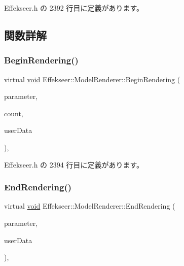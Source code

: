  Effekseer.\+h の 2392 行目に定義があります。



\subsection{関数詳解}
\mbox{\label{class_effekseer_1_1_model_renderer_a9fcfb17ad8e41bacadc862cfef302490}} 
\subsubsection{\texorpdfstring{Begin\+Rendering()}{BeginRendering()}}
{\footnotesize\ttfamily virtual \mbox{\hyperlink{namespace_effekseer_ab34c4088e512200cf4c2716f168deb56}{void}} Effekseer\+::\+Model\+Renderer\+::\+Begin\+Rendering (\begin{DoxyParamCaption}\item[{const \mbox{\hyperlink{struct_effekseer_1_1_model_renderer_1_1_node_parameter}{Node\+Parameter}} \&}]{parameter,  }\item[{int32\+\_\+t}]{count,  }\item[{\mbox{\hyperlink{namespace_effekseer_ab34c4088e512200cf4c2716f168deb56}{void}} $\ast$}]{user\+Data }\end{DoxyParamCaption})\hspace{0.3cm}{\ttfamily [inline]}, {\ttfamily [virtual]}}



 Effekseer.\+h の 2394 行目に定義があります。

\mbox{\label{class_effekseer_1_1_model_renderer_afabdeb2f4c342416a270c13840175082}} 
\subsubsection{\texorpdfstring{End\+Rendering()}{EndRendering()}}
{\footnotesize\ttfamily virtual \mbox{\hyperlink{namespace_effekseer_ab34c4088e512200cf4c2716f168deb56}{void}} Effekseer\+::\+Model\+Renderer\+::\+End\+Rendering (\begin{DoxyParamCaption}\item[{const \mbox{\hyperlink{struct_effekseer_1_1_model_renderer_1_1_node_parameter}{Node\+Parameter}} \&}]{parameter,  }\item[{\mbox{\hyperlink{namespace_effekseer_ab34c4088e512200cf4c2716f168deb56}{void}} $\ast$}]{user\+Data }\end{DoxyParamCaption})\hspace{0.3cm}{\ttfamily [inline]}, {\ttfamily [virtual]}}



